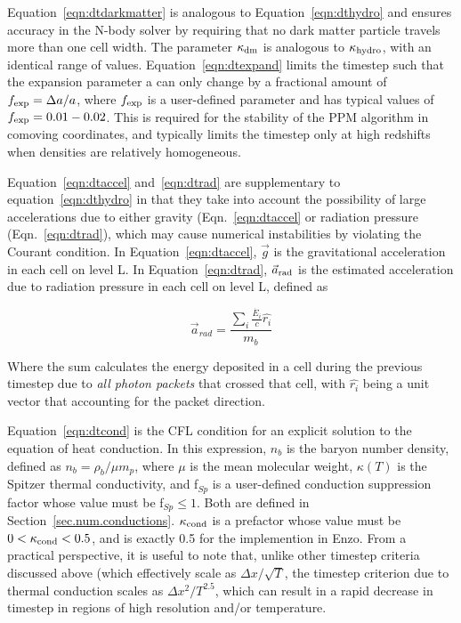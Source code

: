 Equation~\ref{eqn:dtdarkmatter} is analogous to
Equation~\ref{eqn:dthydro} and ensures accuracy in the N-body solver
by requiring that no dark matter particle travels more than one cell
width.  The parameter $\kappa_{\rm dm}$ is analogous to $\kappa_{\rm
  hydro}$, with an identical range of values.
Equation~\ref{eqn:dtexpand} limits the timestep such that the
expansion parameter a can only change by a fractional amount of
$f_{\rm exp} = \Delta a/a$, where $f_{\rm exp}$ is a user-defined
parameter and has typical values of $f_{\rm exp} = 0.01-0.02$.  This
is required for the stability of the PPM algorithm in comoving
coordinates, and typically limits the timestep only at high redshifts
when densities are relatively homogeneous.

Equation~\ref{eqn:dtaccel} and~\ref{eqn:dtrad} are supplementary to equation~\ref{eqn:dthydro} in that they
take into account the possibility of large accelerations due to either
gravity (Eqn.~\ref{eqn:dtaccel} or radiation pressure
(Eqn.~\ref{eqn:dtrad}), which may cause numerical 
instabilities by violating the Courant condition.  In Equation~\ref{eqn:dtaccel}, $\vec{g}$ is the
gravitational acceleration in each cell on level L.  In
Equation~\ref{eqn:dtrad}, $\vec{a}_{\rm rad}$ is the estimated
acceleration due to radiation pressure in each cell on level L,
defined as

\begin{equation}
\vec{a}_{rad} = \frac{ \sum_i \frac{\dot{E_i}}{c} \hat{r_i} }{m_b} 
\end{equation}

Where the sum calculates the energy deposited in a cell during the
previous timestep due to \textit{all photon packets} that crossed that
cell, with $\hat{r_i}$ being a unit vector that accounting for the
packet direction.

Equation~\ref{eqn:dtcond} is the CFL condition for an explicit
solution to the equation of heat conduction.  In this expression,
$n_b$ is the baryon number density, defined as $n_b = \rho_b / \mu
m_p$, where $\mu$ is the mean molecular weight, $\kappa(T)$ is the
Spitzer thermal conductivity, and f$_{Sp}$ is a user-defined
conduction suppression factor whose value must be f$_{Sp} \leq 1$.  Both are defined in
Section~\ref{sec.num.conductions}.  $\kappa_{\rm cond}$ is a prefactor whose
value must be $0 < \kappa_{\rm cond}  < 0.5$, and is exactly 0.5 for the
implemention in Enzo.
From a practical
perspective, it is useful to note that, unlike other timestep criteria
discussed above (which effectively scale as $\Delta x / \sqrt{T}$,
the timestep criterion due to thermal conduction scales as $\Delta x^2
/ T^{2.5}$, which can result in a rapid decrease in timestep in
regions of high resolution and/or temperature.

